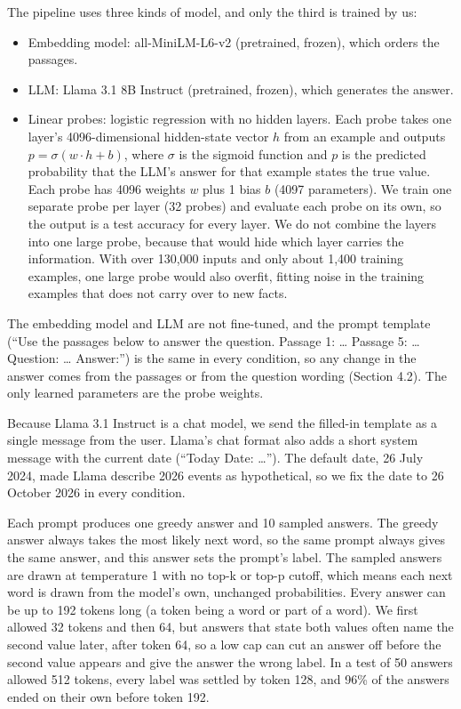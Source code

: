 \documentclass[
  12pt,
  letterpaper,
]{article}
\providecommand{\tightlist}{%
  \setlength{\itemsep}{0pt}\setlength{\parskip}{0pt}}
\begin{document}
The pipeline uses three kinds of model, and only
the third is trained by us:

\begin{itemize}
\tightlist
\item
  Embedding model: all-MiniLM-L6-v2 (pretrained,
  frozen), which orders the passages.
\item
  LLM: Llama 3.1 8B Instruct (pretrained, frozen),
  which generates the answer.
\item
  Linear probes: logistic regression with no
  hidden layers. Each probe takes one layer's
  4096-dimensional hidden-state vector \(h\) from
  an example and outputs
  \(p = \sigma(w \cdot h + b)\), where \(\sigma\)
  is the sigmoid function and \(p\) is the
  predicted probability that the LLM's answer for
  that example states the true value. Each probe
  has 4096 weights \(w\) plus 1 bias \(b\) (4097
  parameters). We train one separate probe per
  layer (32 probes) and evaluate each probe on its
  own, so the output is a test accuracy for every
  layer. We do not combine the layers into one
  large probe, because that would hide which layer
  carries the information. With over 130,000
  inputs and only about 1,400 training examples,
  one large probe would also overfit, fitting
  noise in the training examples that does not
  carry over to new facts.
\end{itemize}

The embedding model and LLM are not fine-tuned,
and the prompt template (``Use the passages below
to answer the question. Passage 1: \ldots{}
Passage 5: \ldots{} Question: \ldots{} Answer:'')
is the same in every condition, so any change in
the answer comes from the passages or from the
question wording (Section 4.2). The only learned
parameters are the probe weights.

Because Llama 3.1 Instruct is a chat model, we
send the filled-in template as a single message
from the user. Llama's chat format also adds a
short system message with the current date
(``Today Date: \ldots{}''). The default date, 26
July 2024, made Llama describe 2026 events as
hypothetical, so we fix the date to 26 October
2026 in every condition.

Each prompt produces one greedy answer and 10
sampled answers. The greedy answer always takes
the most likely next word, so the same prompt
always gives the same answer, and this answer sets
the prompt's label. The sampled answers are drawn
at temperature 1 with no top-k or top-p cutoff,
which means each next word is drawn from the
model's own, unchanged probabilities. Every answer
can be up to 192 tokens long (a token being a word
or part of a word). We first allowed 32 tokens and
then 64, but answers that state both values often
name the second value later, after token 64, so a
low cap can cut an answer off before the second
value appears and give the answer the wrong label.
In a test of 50 answers allowed 512 tokens, every
label was settled by token 128, and 96\% of the
answers ended on their own before token 192.
\end{document}
